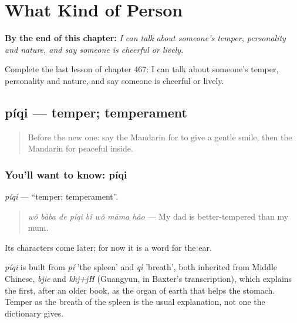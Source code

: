 
\chapter{What Kind of Person}
\label{ch:zh-what-kind-of-person}

\begin{chapteropening}
\textbf{By the end of this chapter:} \emph{I can talk about someone's temper, personality and nature, and say someone is cheerful or lively.}

Complete the last lesson of chapter 467: I can talk about someone's temper, personality and nature, and say someone is cheerful or lively.
\end{chapteropening}

\section[píqi]{píqi — temper; temperament}

\label{lesson:ZH-C467-piqi}



\begin{quote}
Before the new one: say the Mandarin for to give a gentle smile, then the Mandarin for peaceful inside.
\end{quote}

\subsection*{You'll want to know: píqi}
\emph{píqi} — \textquotedblleft{}temper; temperament\textquotedblright{}.

\begin{quote}
\emph{wǒ bàba de píqi bǐ wǒ māma hǎo} — My dad is better-tempered than my mum.
\end{quote}

Its characters come later; for now it is a word for the ear.

\begin{cousinweb}
\emph{píqi} is built from \emph{pí} 'the spleen' and \emph{qì} 'breath', both inherited from Middle Chinese, \emph{bjie} and \emph{khj+jH} (Guangyun, in Baxter's transcription), which explains the first, after an older book, as the organ of earth that helps the stomach. Temper as the breath of the spleen is the usual explanation, not one the dictionary gives.
\end{cousinweb}

